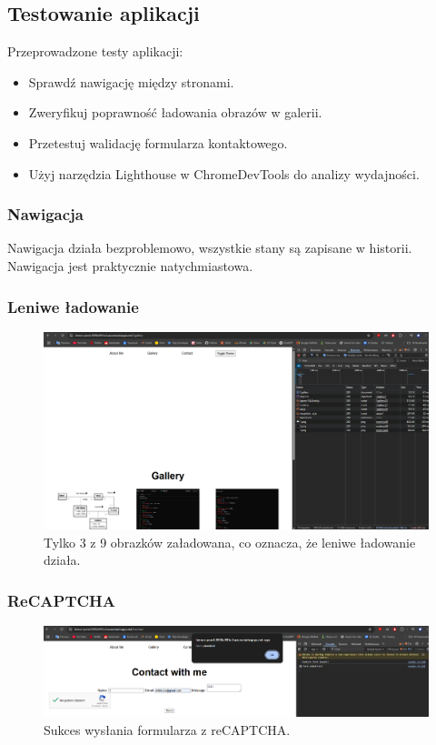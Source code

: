 \documentclass[a4paper,12pt]{article}
\begin{document}
\subsection{Testowanie aplikacji}
Przeprowadzone testy aplikacji:
\begin{itemize}
    \item Sprawdź nawigację między stronami.
    \item Zweryfikuj poprawność ładowania obrazów w galerii.
    \item Przetestuj walidację formularza kontaktowego.
    \item Użyj narzędzia Lighthouse w ChromeDevTools do analizy wydajności.
\end{itemize}

\subsubsection{Nawigacja}

Nawigacja działa bezproblemowo, wszystkie stany są zapisane w historii. Nawigacja jest praktycznie natychmiastowa.

\subsubsection{Leniwe ładowanie}

\begin{figure}[H]
    \centering
    \includegraphics[width=1\textwidth]{images/lazy_2.png}
    \caption{Tylko 3 z 9 obrazków załadowana, co oznacza, że leniwe ładowanie działa.}
\end{figure}

\subsubsection{ReCAPTCHA}

\begin{figure}[H]
    \centering
    \includegraphics[width=1\textwidth]{images/contact_success.png}
    \caption{Sukces wysłania formularza z reCAPTCHA.}
\end{figure}
\end{document}
